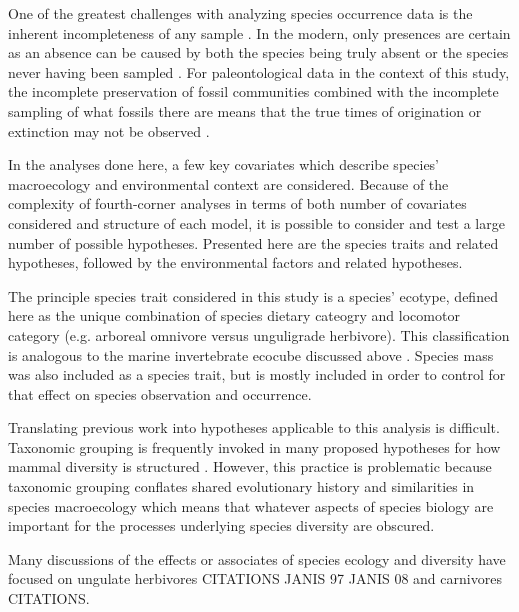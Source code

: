 \documentclass[12pt,letterpaper]{article}
\begin{document}
One of the greatest challenges with analyzing species occurrence data is the inherent incompleteness of any sample \citep{Royle2008,Royle2014,Foote1999a,Foote2001,Lloyd2011,Wang2016b}. In the modern, only presences are certain as an absence can be caused by both the species being truly absent or the species never having been sampled \citep{Royle2008,Royle2014}. For paleontological data in the context of this study, the incomplete preservation of fossil communities combined with the incomplete sampling of what fossils there are means that the true times of origination or extinction may not be observed \citep{Foote1999a,Foote2001,Wang2015,Wang2016b}.



In the analyses done here, a few key covariates which describe species' macroecology and environmental context are considered. Because of the complexity of fourth-corner analyses in terms of both number of covariates considered and structure of each model, it is possible to consider and test a large number of possible hypotheses. Presented here are the species traits and related hypotheses, followed by the environmental factors and related hypotheses.

The principle species trait considered in this study is a species' ecotype, defined here as the unique combination of species dietary cateogry and locomotor category (e.g. arboreal omnivore versus unguligrade herbivore). This classification is analogous to the marine invertebrate ecocube discussed above \citep{Bush2007,Bambach2008,Bush2011}. Species mass was also included as a species trait, but is mostly included in order to control for that effect on species observation and occurrence.


Translating previous work into hypotheses applicable to this analysis is difficult. Taxonomic grouping is frequently invoked in many proposed hypotheses for how mammal diversity is structured \citep{Quental2013,Slater2015c,Janis1993c,Pires2015a}. However, this practice is problematic because taxonomic grouping conflates shared evolutionary history and similarities in species macroecology which means that whatever aspects of species biology are important for the processes underlying species diversity are obscured.

Many discussions of the effects or associates of species ecology and diversity have focused on ungulate herbivores \citep{Janis2004,Janis2000,Janis1993c} CITATIONS JANIS 97 JANIS 08 and carnivores \citep{Pires2015a,Slater2015c,Janis1993c} CITATIONS. 
\end{document}
